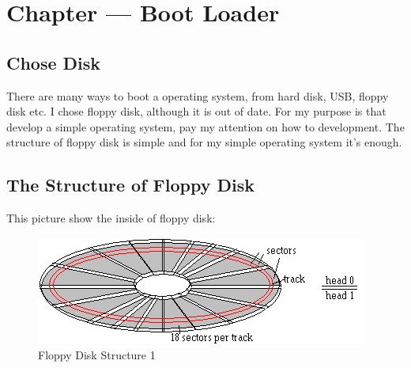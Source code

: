 \documentclass{swfcthesis}
\begin{document}

\chapter{Chapter --- Boot Loader}

\section{Chose Disk}
\label{sec:chose-disk}

There are many ways to boot a operating system, from hard disk, USB, floppy disk etc. I
chose floppy disk, although it is out of date. For my purpose is that develop a simple
operating system, pay my attention on how to development. The structure of floppy disk is
simple and for my simple operating system it's enough.

\section{The Structure of Floppy Disk}
\label{sec:struct-floppy-disk}

This picture show the inside of floppy disk:
\begin{figure}[!ht]
  \centering
  \includegraphics[width=.5\textwidth]{flpy1}
  \caption{Floppy Disk Structure 1}
  \label{fig:flpy1.png}
\end{figure}
\end{document}
